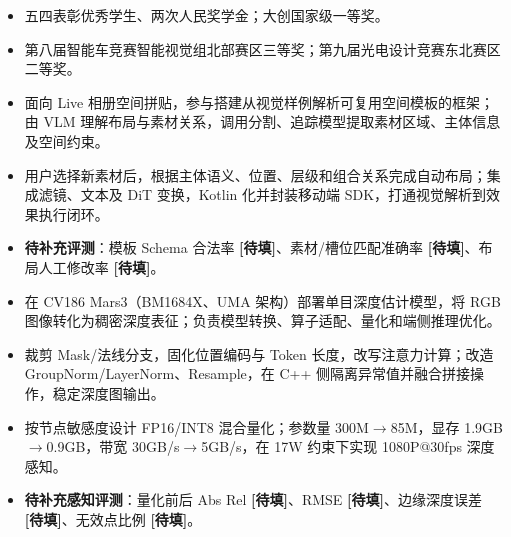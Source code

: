 
\begin{itemize}
  \item 五四表彰优秀学生、两次人民奖学金；大创国家级一等奖。
  \item 第八届智能车竞赛智能视觉组北部赛区三等奖；第九届光电设计竞赛东北赛区二等奖。
\end{itemize}

\begin{itemize}
  \item 面向 Live 相册空间拼贴，参与搭建从视觉样例解析可复用空间模板的框架；由 VLM 理解布局与素材关系，调用分割、追踪模型提取素材区域、主体信息及空间约束。
  \item 用户选择新素材后，根据主体语义、位置、层级和组合关系完成自动布局；集成滤镜、文本及 DiT 变换，Kotlin 化并封装移动端 SDK，打通视觉解析到效果执行闭环。
  \item \textbf{待补充评测}：模板 Schema 合法率 \textbf{[待填]}、素材/槽位匹配准确率 \textbf{[待填]}、布局人工修改率 \textbf{[待填]}。
\end{itemize}

\begin{itemize}
  \item 在 CV186 Mars3（BM1684X、UMA 架构）部署单目深度估计模型，将 RGB 图像转化为稠密深度表征；负责模型转换、算子适配、量化和端侧推理优化。
  \item 裁剪 Mask/法线分支，固化位置编码与 Token 长度，改写注意力计算；改造 GroupNorm/LayerNorm、Resample，在 C++ 侧隔离异常值并融合拼接操作，稳定深度图输出。
  \item 按节点敏感度设计 FP16/INT8 混合量化；参数量 300M$\rightarrow$85M，显存 1.9GB$\rightarrow$0.9GB，带宽 30GB/s$\rightarrow$5GB/s，在 17W 约束下实现 1080P@30fps 深度感知。
  \item \textbf{待补充感知评测}：量化前后 Abs Rel \textbf{[待填]}、RMSE \textbf{[待填]}、边缘深度误差 \textbf{[待填]}、无效点比例 \textbf{[待填]}。
\end{itemize}

